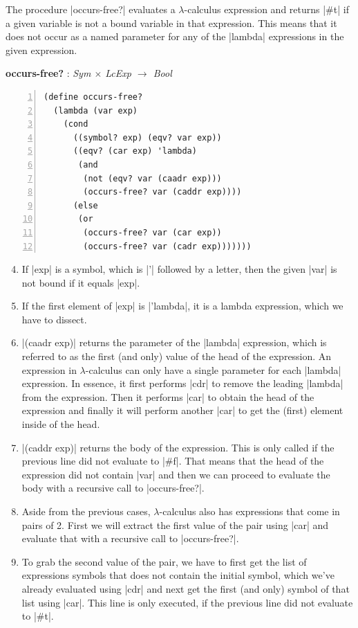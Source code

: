\documentclass[a4paper]{article}
\begin{document}
The procedure |occurs-free?| evaluates a $\lambda$-calculus expression and returns |#t| if a given variable is not a bound variable in that expression. This means that it does not occur as a named parameter for any of the |lambda| expressions in the given expression.

\textbf{occurs-free?} : \textit{Sym $\times$ LcExp $\rightarrow$ Bool}
\begin{lstlisting}[aboveskip=0pt,numbers=left]
(define occurs-free?
  (lambda (var exp)
    (cond
      ((symbol? exp) (eqv? var exp))
      ((eqv? (car exp) 'lambda)
       (and
        (not (eqv? var (caadr exp)))
        (occurs-free? var (caddr exp))))
      (else
       (or
        (occurs-free? var (car exp))
        (occurs-free? var (cadr exp)))))))
\end{lstlisting}


\begin{enumerate}
\setcounter{enumi}{3}
\item If |exp| is a symbol, which is |'| followed by a letter, then the given |var| is not bound if it equals |exp|.
\item If the first element of |exp| is |'lambda|, it is a lambda expression, which we have to dissect.
\setcounter{enumi}{6}
\item |(caadr exp)| returns the parameter of the |lambda| expression, which is referred to as the first (and only) value of the head of the expression. An expression in $\lambda$-calculus can only have a single parameter for each |lambda| expression. In essence, it first performs |cdr| to remove the leading |lambda| from the expression. Then it performs |car| to obtain the head of the expression and finally it will perform another |car| to get the (first) element inside of the head.
\item |(caddr exp)| returns the body of the expression. This is only called if the previous line did not evaluate to |#f|. That means that the head of the expression did not contain |var| and then we can proceed to evaluate the body with a recursive call to |occurs-free?|.
\setcounter{enumi}{10}
\item Aside from the previous cases, $\lambda$-calculus also has expressions that come in pairs of 2. First we will extract the first value of the pair using |car| and evaluate that with a recursive call to |occurs-free?|.
\item To grab the second value of the pair, we have to first get the list of expressions symbols that does not contain the initial symbol, which we've already evaluated using |cdr| and next get the first (and only) symbol of that list using |car|. This line is only executed, if the previous line did not evaluate to |#t|.
\end{enumerate}
\end{document}
